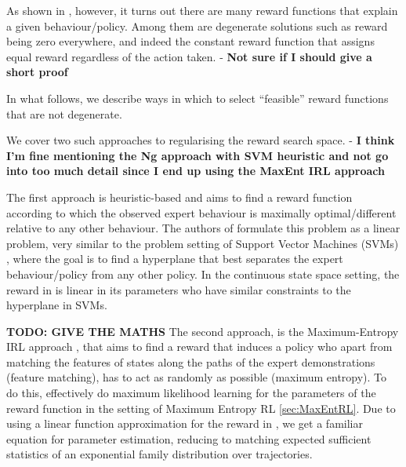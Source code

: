 \documentclass{report}
\numberwithin{equation}{section}
\numberwithin{figure}{section}
\numberwithin{table}{section}
\numberwithin{algorithm}{section}
\begin{document}
As shown in \cite{NgIRL}, however, it turns out there are many 
reward functions that explain a given behaviour/policy. Among 
them are degenerate solutions such as reward being zero everywhere, 
and indeed the constant reward function that assigns equal reward 
regardless of the action taken. - \textbf{Not sure if I should give a short proof}

In what follows, we describe ways in which to select ``feasible'' 
reward functions that are not degenerate. 

We cover two such approaches to regularising the reward 
search space. - \textbf{I think I'm fine mentioning the Ng 
approach with SVM heuristic and not go into too much detail 
since I end up using the MaxEnt IRL approach}


The first approach is heuristic-based \citep{NgIRL} and 
aims to find 
a reward function according to which the observed expert behaviour 
is maximally optimal/different relative to any other behaviour. The 
authors of \cite{NgIRL} formulate this problem as a linear problem, 
very similar to the problem setting of Support Vector Machines 
(SVMs) \citep{SVMs}, where the goal is to find a hyperplane that 
best separates the expert behaviour/policy from any other policy. 
In the continuous state space setting, the reward in \cite{NgIRL} 
is linear in its parameters who have similar constraints to 
the hyperplane in SVMs.

\textbf{TODO: GIVE THE MATHS}
The second approach, is the Maximum-Entropy IRL approach 
\citep{Ziebart2008}, that aims to find a reward that induces 
a policy who apart from matching the features of 
states along the paths of the expert demonstrations (feature 
matching), has 
to act as randomly as possible (maximum entropy). To do this, 
\cite{Ziebart2008} effectively do maximum likelihood learning 
for the parameters of the reward function in the setting of 
Maximum Entropy RL \ref{sec:MaxEntRL}. Due to using a linear 
function approximation for the reward in \cite{Ziebart2008}, 
we get a familiar equation for parameter estimation, reducing 
to matching expected sufficient statistics of an exponential 
family distribution over trajectories. 


\end{document}
